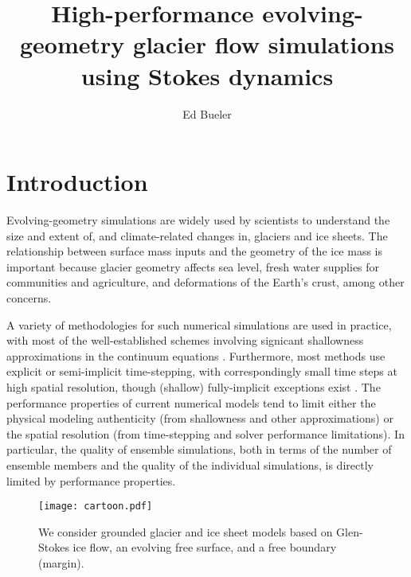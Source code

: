 \documentclass[letterpaper,final,12pt,reqno]{amsart}
\begin{document}
\title[High-performance evolving-geometry glacier flow simulations]{High-performance evolving-geometry glacier flow simulations using Stokes dynamics}

\author{Ed Bueler}

\maketitle

\thispagestyle{empty}
\bigskip

\section{Introduction} \label{sec:intro}

Evolving-geometry simulations are widely used by scientists to understand the size and extent of, and climate-related changes in, glaciers and ice sheets.  The relationship between surface mass inputs and the geometry of the ice mass is important because glacier geometry affects sea level, fresh water supplies for communities and agriculture, and deformations of the Earth's crust, among other concerns.

A variety of methodologies for such numerical simulations are used in practice, with most of the well-established schemes involving signicant shallowness approximations in the continuum equations \cite[for example]{Hoffmanetal2018,Lipscombetal2019,Winkelmannetal2011}.  Furthermore, most methods use explicit or semi-implicit time-stepping, with correspondingly small time steps at high spatial resolution, though (shallow) fully-implicit exceptions exist \cite{Brinkerhoffetal2017,Bueler2016}.  The performance properties of current numerical models tend to limit either the physical modeling authenticity (from shallowness and other approximations) or the spatial resolution (from time-stepping and solver performance limitations).  In particular, the quality of ensemble simulations, both in terms of the number of ensemble members and the quality of the individual simulations, is directly limited by performance properties.

\begin{figure}[h]
\begin{center}
\texttt{[image: cartoon.pdf]}
\end{center}
\caption{We consider grounded glacier and ice sheet models based on Glen-Stokes ice flow, an evolving free surface, and a free boundary (margin).}
\label{fig:cartoon}
\end{figure}
\end{document}
